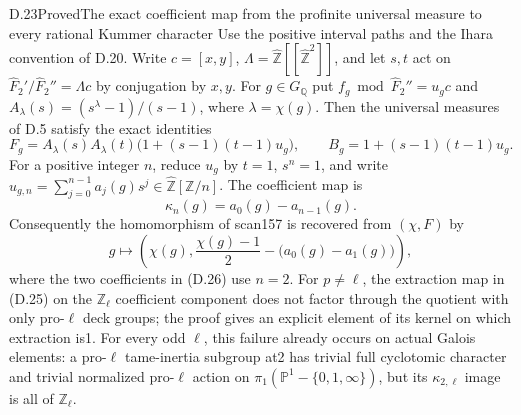 \begin{statement}{D.23}{Proved}{The exact coefficient map from the profinite universal measure to every rational Kummer character}
Use the positive interval paths and the Ihara convention of D.20. Write
$c=[x,y]$, $\Lambda=\widehat{\mathbb Z}[[\widehat{\mathbb Z}^2]]$,
and let $s,t$ act on $\widehat F_2'/\widehat F_2''=\Lambda c$ by conjugation by $x,y$.
For $g\in G_{\mathbb Q}$ put $f_g\bmod\widehat F_2''=u_g c$ and
$A_\lambda(s)=(s^\lambda-1)/(s-1)$, where $\lambda=\chi(g)$.
Then the universal measures of D.5 satisfy the exact identities
\[
 F_g=A_\lambda(s)A_\lambda(t)
          \bigl(1+(s-1)(t-1)u_g\bigr),\qquad
 B_g=1+(s-1)(t-1)u_g.                                    \tag{D.24}
\]
For a positive integer $n$, reduce $u_g$ by $t=1$, $s^n=1$, and write
$u_{g,n}=\sum_{j=0}^{n-1}a_j(g)s^j\in\widehat{\mathbb Z}[\mathbb Z/n]$.
The coefficient map is
\[
 \kappa_n(g)=a_0(g)-a_{n-1}(g).                            \tag{D.25}
\]
Consequently the homomorphism of scan157 is recovered from $(\chi,F)$ by
\[
 g\longmapsto
 \left(\chi(g),\frac{\chi(g)-1}{2}
                 -\bigl(a_0(g)-a_1(g)\bigr)\right),        \tag{D.26}
\]
where the two coefficients in (D.26) use $n=2$.
For $p\ne\ell$, the extraction map in (D.25) on the $\mathbb Z_\ell$ coefficient component does not factor through the quotient with only pro-$\ell$ deck groups; the proof gives an explicit element of its kernel on which extraction is1. For every odd $\ell$, this failure already occurs on actual Galois elements: a pro-$\ell$ tame-inertia subgroup at2 has trivial full cyclotomic character and trivial normalized pro-$\ell$ action on $\pi_1(\mathbb P^1-\{0,1,\infty\})$, but its $\kappa_{2,\ell}$ image is all of $\mathbb Z_\ell$.
\end{statement}
